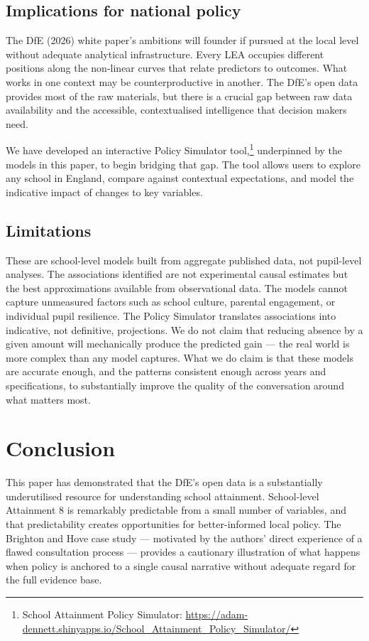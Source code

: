 \documentclass[
  12pt,
  titlepage]{article}
\begin{document}
\subsection{Implications for national
policy}\label{implications-for-national-policy}

The DfE (2026) white paper's ambitions will founder if pursued at the
local level without adequate analytical infrastructure. Every LEA
occupies different positions along the non-linear curves that relate
predictors to outcomes. What works in one context may be
counterproductive in another. The DfE's open data provides most of the
raw materials, but there is a crucial gap between raw data availability
and the accessible, contextualised intelligence that decision makers
need.

We have developed an interactive Policy Simulator tool,\footnote{School
  Attainment Policy Simulator:
  \url{https://adam-dennett.shinyapps.io/School_Attainment_Policy_Simulator/}}
underpinned by the models in this paper, to begin bridging that gap. The
tool allows users to explore any school in England, compare against
contextual expectations, and model the indicative impact of changes to
key variables.

\subsection{Limitations}\label{limitations}

These are school-level models built from aggregate published data, not
pupil-level analyses. The associations identified are not experimental
causal estimates but the best approximations available from
observational data. The models cannot capture unmeasured factors such as
school culture, parental engagement, or individual pupil resilience. The
Policy Simulator translates associations into indicative, not
definitive, projections. We do not claim that reducing absence by a
given amount will mechanically produce the predicted gain --- the real
world is more complex than any model captures. What we do claim is that
these models are accurate enough, and the patterns consistent enough
across years and specifications, to substantially improve the quality of
the conversation around what matters most.

\section{Conclusion}\label{conclusion}

This paper has demonstrated that the DfE's open data is a substantially
underutilised resource for understanding school attainment. School-level
Attainment 8 is remarkably predictable from a small number of variables,
and that predictability creates opportunities for better-informed local
policy. The Brighton and Hove case study --- motivated by the authors'
direct experience of a flawed consultation process --- provides a
cautionary illustration of what happens when policy is anchored to a
single causal narrative without adequate regard for the full evidence
base.
\end{document}
